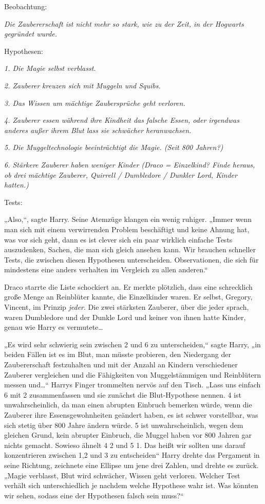 {Beobachtung:

\emph{Die Zaubererschaft ist nicht mehr so stark, wie zu der Zeit, in der Hogwarts gegründet wurde.}

Hypothesen:

\emph{1. Die Magie selbst verblasst.}

\emph{2. Zauberer} \emph{kreuzen sich mit Muggeln und Squibs.}

\emph{3. Das Wissen um mächtige Zaubersprüche geht verloren.}

\emph{4. Zauberer essen während ihre Kindheit das falsche Essen, oder irgendwas anderes außer ihrem Blut lass sie schwächer heranwachsen.}

\emph{5. Die Muggeltechnologie beeinträchtigt die Magie. (Seit 800 Jahren?)}

\emph{6. Stärkere Zauberer haben weniger Kinder (Draco = Einzelkind? Finde heraus, ob drei mächtige Zauberer, Quirrell / Dumbledore / Dunkler Lord, Kinder hatten.)}

Tests:

„Also,“, sagte Harry. Seine Atemzüge klangen ein wenig ruhiger. „Immer wenn man sich mit einem verwirrenden Problem beschäftigt und keine Ahnung hat, was vor sich geht, dann es ist clever sich ein paar wirklich einfache Tests auszudenken, Sachen, die man sich gleich ansehen kann. Wir brauchen schneller Tests, die zwischen diesen Hypothesen unterscheiden. Observationen, die sich für mindestens eine anders verhalten im Vergleich zu allen anderen.“

Draco starrte die Liste schockiert an. Er merkte plötzlich, dass eine schrecklich große Menge an Reinblüter kannte, die Einzelkinder waren. Er selbst, Gregory, Vincent, im Prinzip \emph{jeder}. Die zwei stärksten Zauberer, über die jeder sprach, waren Dumbledore und der Dunkle Lord und keiner von ihnen hatte Kinder, genau wie Harry es vermutete…

„Es wird sehr schwierig sein zwischen 2 und 6 zu unterscheiden,“ sagte Harry, „in beiden Fällen ist es im Blut, man müsste probieren, den Niedergang der Zaubererschaft festzuhalten und mit der Anzahl an Kindern verschiedener Zauberer vergleichen und die Fähigkeiten von Muggelstämmigen und Reinblütern messen und…“ Harrys Finger trommelten nervös auf den Tisch. „Lass uns einfach 6 mit 2 zusammenfassen und sie zunächst die Blut-Hypothese nennen. 4 ist unwahrscheinlich, da man einen abrupten Einbruch bemerken würde, wenn die Zauberer ihre Essensgewohnheiten geändert haben, es ist schwer vorstellbar, was sich stetig über 800 Jahre ändern würde. 5 ist unwahrscheinlich, wegen dem gleichen Grund, kein abrupter Einbruch, die Muggel haben vor 800 Jahren gar nichts gemacht. Sowieso ähnelt 4 2 und 5 1. Das heißt wir sollten uns darauf konzentrieren zwischen 1,2 und 3 zu entscheiden“ Harry drehte das Pergament in seine Richtung, zeichnete eine Ellipse um jene drei Zahlen, und drehte es zurück. „Magie verblasst, Blut wird schwächer, Wissen geht verloren. Welcher Test verhält sich unterschiedlich je nachdem welche Hypothese wahr ist. Was könnten wir sehen, sodass eine der Hypothesen falsch sein muss?“

}
